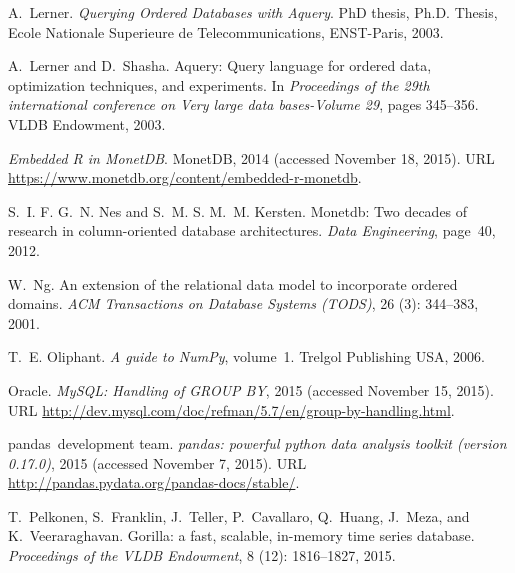 \documentclass{acm_proc_article-sp}
\begin{document}
\begin{thebibliography}{28}
A.~Lerner.
\newblock \emph{Querying Ordered Databases with Aquery}.
\newblock PhD thesis, Ph.D. Thesis, Ecole Nationale Superieure de
  Telecommunications, ENST-Paris, 2003.

A.~Lerner and D.~Shasha.
\newblock Aquery: Query language for ordered data, optimization techniques, and
  experiments.
\newblock In \emph{Proceedings of the 29th international conference on Very
  large data bases-Volume 29}, pages 345--356. VLDB Endowment, 2003.

\emph{Embedded R in MonetDB}.
\newblock MonetDB, 2014 (accessed November 18, 2015).
\newblock URL \url{https://www.monetdb.org/content/embedded-r-monetdb}.

S.~I. F. G.~N. Nes and S.~M. S. M.~M. Kersten.
\newblock Monetdb: Two decades of research in column-oriented database
  architectures.
\newblock \emph{Data Engineering}, page~40, 2012.

W.~Ng.
\newblock An extension of the relational data model to incorporate ordered
  domains.
\newblock \emph{ACM Transactions on Database Systems (TODS)}, 26
  (3): 344--383, 2001.

T.~E. Oliphant.
\newblock \emph{A guide to NumPy}, volume~1.
\newblock Trelgol Publishing USA, 2006.

Oracle.
\newblock \emph{MySQL: Handling of GROUP BY}, 2015 (accessed November 15,
  2015).
\newblock URL
  \url{http://dev.mysql.com/doc/refman/5.7/en/group-by-handling.html}.

pandas~development team.
\newblock \emph{pandas: powerful python data analysis toolkit (version
  0.17.0)}, 2015 (accessed November 7, 2015).
\newblock URL \url{http://pandas.pydata.org/pandas-docs/stable/}.

T.~Pelkonen, S.~Franklin, J.~Teller, P.~Cavallaro, Q.~Huang, J.~Meza, and
  K.~Veeraraghavan.
\newblock Gorilla: a fast, scalable, in-memory time series database.
\newblock \emph{Proceedings of the VLDB Endowment}, 8 (12):
  1816--1827, 2015.


\end{thebibliography}
\end{document}
